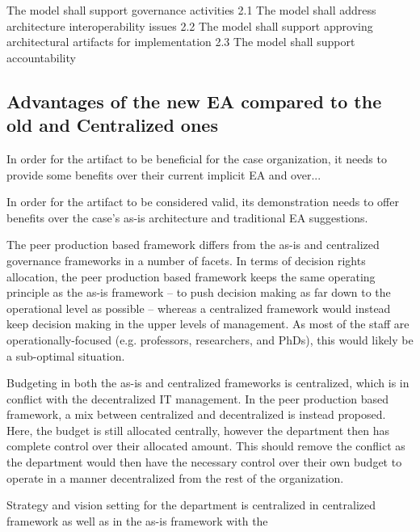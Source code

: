 The model shall support governance activities
2.1 The model shall address architecture interoperability issues
2.2 The model shall support approving architectural artifacts for implementation
2.3 The model shall support accountability


\subsection{Advantages of the new EA compared to the old and Centralized ones}

In order for the artifact to be beneficial for the case organization, it needs to provide some benefits over their current implicit EA and over... 

In order for the artifact to be considered valid, its demonstration needs to offer benefits over the case's as-is architecture and traditional EA suggestions. 


The peer production based framework differs from the as-is and centralized governance frameworks in a number of facets. In terms of decision rights allocation, the peer production based framework keeps the same operating principle as the as-is framework -- to push decision making as far down to the operational level as possible -- whereas a centralized framework would instead keep decision making in the upper levels of management. As most of the staff are operationally-focused (e.g. professors, researchers, and PhDs), this would likely be a sub-optimal situation. 

Budgeting in both the as-is and centralized frameworks is centralized, which is in conflict with the decentralized IT management. In the peer production based framework, a mix between  centralized and decentralized is instead proposed. Here, the budget is still allocated centrally, however the department then has complete control over their allocated amount. This should remove the conflict as the department would then have the necessary control over their own budget to operate in a manner decentralized from the rest of the organization. 

Strategy and vision setting for the department is centralized in centralized framework as well as in the as-is framework with the 



